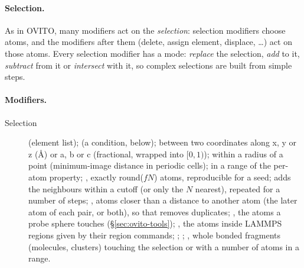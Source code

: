 \paragraph{Selection.} As in OVITO, many modifiers act on the \emph{selection}: selection modifiers choose atoms, and the modifiers after them (delete, assign element, displace, \ldots) act on those atoms. Every selection modifier has a  mode: \emph{replace} the selection, \emph{add} to it, \emph{subtract} from it or \emph{intersect} with it, so complex selections are built from simple steps.

\paragraph{Modifiers.}
\begin{description}
\item[Selection]  (element list);  (a condition, below);  between two coordinates along x, y or z (\AA) or a, b or c (fractional, wrapped into $[0,1)$);  within a radius of a point (minimum-image distance in periodic cells);  in a range of the per-atom property; , exactly round($fN$) atoms, reproducible for a seed;  adds the neighbours within a cutoff (or only the $N$ nearest), repeated for a number of steps; , atoms closer than a distance to another atom (the later atom of each pair, or both), so that  removes duplicates; , the atoms a probe sphere touches (\S\ref{sec:ovito-tools}); , the atoms inside LAMMPS regions given by their region commands; ; ; , whole bonded fragments (molecules, clusters) touching the selection or with a number of atoms in a range.

\end{description}
